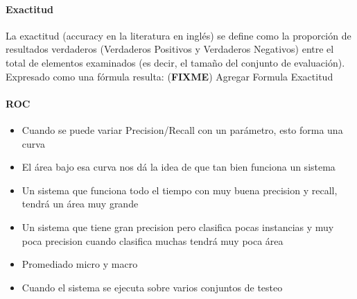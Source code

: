 \documentclass[a4paper,11pt,spanish]{book}
\newcommand*{\FIXME}[1]{{(\textbf{FIXME}) {#1}}}
\begin{document}
	  \paragraph { Exactitud }
	    La exactitud (accuracy en la literatura en inglés) se define como la proporción de resultados verdaderos (Verdaderos Positivos y Verdaderos Negativos) entre el total 
	    de elementos examinados (es decir, el tamaño del conjunto de evaluación). Expresado como una fórmula resulta:
	    \FIXME{Agregar Formula Exactitud}

	  \paragraph {ROC}
	    \begin{itemize}
	      \item Cuando se puede variar Precision/Recall con un parámetro, esto forma una curva
	      \item El área bajo esa curva nos dá la idea de que tan bien funciona un sistema
	      \item Un sistema que funciona todo el tiempo con muy buena precision y recall, tendrá un área muy grande
	      \item Un sistema que tiene gran precision pero clasifica pocas instancias y muy poca precision cuando clasifica muchas tendrá muy poca área
	      \item Promediado micro y macro
	      \item Cuando el sistema se ejecuta sobre varios conjuntos de testeo
	    \end{itemize}
\end{document}

